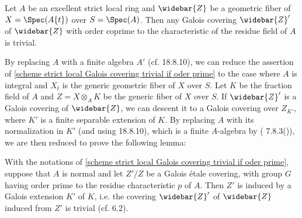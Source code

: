 \begin{proposition}\label{scheme strict local Galois covering trivial if oder prime}
Let $A$ be an excellent strict local ring and $\widebar{Z}$ be a geometric fiber of $X=\Spec(A\{t\})$ over $S=\Spec(A)$. Then any Galois covering $\widebar{Z}'$ of $\widebar{Z}$ with order coprime to the characteristic of the residue field of $A$ is trivial.
\end{proposition}

By replacing $A$ with a finite algebra $A'$ (cf. \cite{EGA4-4} 18.8.10), we can reduce the assertion of \cref{scheme strict local Galois covering trivial if oder prime} to the case where $A$ is integral and $X_{\bar{t}}$ is the generic geometric fiber of $X$ over $S$. Let $K$ be the fraction field of $A$ and $Z=X\otimes_AK$ be the generic fiber of $X$ over $S$. If $\widebar{Z}'$ is a Galois covering of $\widebar{Z}$, we can descent it to a Galois covering over $Z_{K'}$, where $K'$ is a finite separable extension of $K$. By replacing $A$ with its normalization in $K'$ (and using \cite{EGA4-4} 18.8.10), which is a finite $A$-algebra by (\cite{EGA4-3} 7.8.3()), we are then reduced to prove the following lemma:

\begin{lemma}
With the notations of \cref{scheme strict local Galois covering trivial if oder prime}, suppose that $A$ is normal and let $Z'/Z$ be a Galois \'etale covering, with group $G$ having order prime to the residue characteristic $p$ of $A$. Then $Z'$ is induced by a Galois extension $K'$ of $K$, i.e. the covering $\widebar{Z}'$ of $\widebar{Z}$ induced from $Z'$ is trivial (cf. \cite{SGA1}  6.2). 
\end{lemma}

